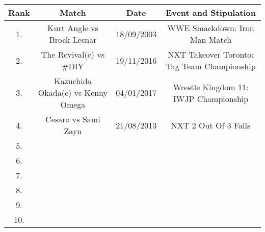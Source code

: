 \documentclass[crop]{standalone}
\begin{document}
\begin{tabular}{|c|c|c|c|}
    \hline
    \rowcolor{violet} Rank & Match & Date & Event and Stipulation \\
    \hline
    \cellcolor{green} 1. & Kurt Angle vs Brock Lesnar & 18/09/2003 & WWE Smackdown: Iron Man Match \\
    \hline
    \cellcolor{orange} 2. & The Revival(c) vs \#DIY & 19/11/2016 & NXT Takeover Toronto: Tag Team Championship \\
    \hline
    \cellcolor{yellow} 3. & Kazuchida Okada(c) vs Kenny Omega & 04/01/2017 & Wrestle Kingdom 11: IWJP Championship \\
    \hline
    \cellcolor{orange} 4. & Cesaro vs Sami Zayn & 21/08/2013 & NXT 2 Out Of 3 Falls \\
    \hline
    5. & & & \\
    \hline
    6. & & & \\
    \hline
    7. & & & \\
    \hline
    8. & & & \\
    \hline
    9. & & & \\
    \hline
    10. & & & \\
    \hline
\end{tabular}
\end{document}
